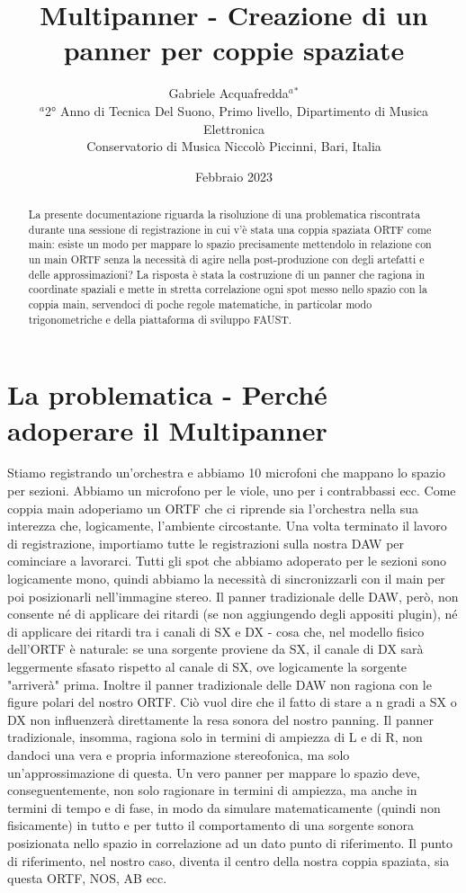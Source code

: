 \documentclass{article}
\title{Multipanner - Creazione di un panner per coppie spaziate}
\author{Gabriele Acquafredda$^{a}$$^{*}$ \\
    \small $^{a}$2° Anno di Tecnica Del Suono, Primo livello, Dipartimento di Musica Elettronica\\
    \small  Conservatorio di Musica Niccolò Piccinni, Bari, Italia\\
}
\date{Febbraio 2023}
\begin{document}
\maketitle

\begin{abstract} 
    \noindent La presente documentazione riguarda la risoluzione di una problematica riscontrata durante una sessione di registrazione in cui v'è stata una coppia spaziata ORTF come main: esiste un modo per mappare lo spazio precisamente mettendolo in relazione con un main ORTF senza la necessità di agire nella post-produzione con degli artefatti e delle approssimazioni? La risposta è stata la costruzione di un panner che ragiona in coordinate spaziali e mette in stretta correlazione ogni spot messo nello spazio con la coppia main, servendoci di poche regole matematiche, in particolar modo trigonometriche e della piattaforma di sviluppo FAUST.
\end{abstract}

\section{La problematica - Perché adoperare il Multipanner}
Stiamo registrando un'orchestra e abbiamo 10 microfoni che mappano lo spazio per sezioni. Abbiamo un microfono per le viole, uno per i contrabbassi ecc. Come coppia main adoperiamo un ORTF che ci riprende sia l'orchestra nella sua interezza che, logicamente, l'ambiente circostante.
Una volta terminato il lavoro di registrazione, importiamo tutte le registrazioni sulla nostra DAW per cominciare a lavorarci. Tutti gli spot che abbiamo adoperato per le sezioni sono logicamente mono, quindi abbiamo la necessità di sincronizzarli con il main per poi posizionarli nell'immagine stereo.
Il panner tradizionale delle DAW, però, non consente né di applicare dei ritardi (se non aggiungendo degli appositi plugin), né di applicare dei ritardi tra i canali di SX e DX - cosa che, nel modello fisico dell'ORTF è naturale: se una sorgente proviene da SX, il canale di DX sarà leggermente sfasato rispetto al canale di SX, ove logicamente la sorgente "arriverà" prima. 
Inoltre il panner tradizionale delle DAW non ragiona con le figure polari del nostro ORTF. Ciò vuol dire che il fatto di stare a n gradi a SX o DX non influenzerà direttamente la resa sonora del nostro panning.
Il panner tradizionale, insomma, ragiona solo in termini di ampiezza di L e di R, non dandoci una vera e propria informazione stereofonica, ma solo un'approssimazione di questa. Un vero panner per mappare lo spazio deve, conseguentemente, non solo ragionare in termini di ampiezza, ma anche in termini di tempo e di fase, in modo da simulare matematicamente (quindi non fisicamente) in tutto e per tutto il comportamento di una sorgente sonora posizionata nello spazio in correlazione ad un dato punto di riferimento. Il punto di riferimento, nel nostro caso, diventa il centro della nostra coppia spaziata, sia questa ORTF, NOS, AB ecc.
\end{document}
